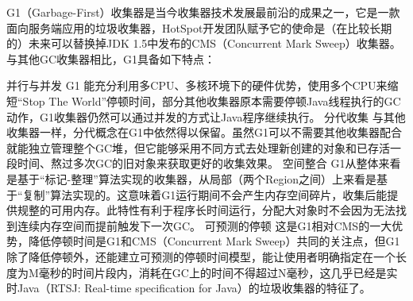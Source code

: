 \documentclass[../../../interview-questions.tex]{subfiles}
\begin{document}
G1（Garbage-First）收集器是当今收集器技术发展最前沿的成果之一，它是一款面向服务端应用的垃圾收集器，HotSpot开发团队赋予它的使命是（在比较长期的）未来可以替换掉JDK 1.5中发布的CMS（Concurrent Mark Sweep）收集器。与其他GC收集器相比，G1具备如下特点：

并行与并发 G1 能充分利用多CPU、多核环境下的硬件优势，使用多个CPU来缩短“Stop The World”停顿时间，部分其他收集器原本需要停顿Java线程执行的GC动作，G1收集器仍然可以通过并发的方式让Java程序继续执行。
分代收集 与其他收集器一样，分代概念在G1中依然得以保留。虽然G1可以不需要其他收集器配合就能独立管理整个GC堆，但它能够采用不同方式去处理新创建的对象和已存活一段时间、熬过多次GC的旧对象来获取更好的收集效果。
空间整合 G1从整体来看是基于“标记-整理”算法实现的收集器，从局部（两个Region之间）上来看是基于“复制”算法实现的。这意味着G1运行期间不会产生内存空间碎片，收集后能提供规整的可用内存。此特性有利于程序长时间运行，分配大对象时不会因为无法找到连续内存空间而提前触发下一次GC。
可预测的停顿 这是G1相对CMS的一大优势，降低停顿时间是G1和CMS（Concurrent Mark Sweep）共同的关注点，但G1除了降低停顿外，还能建立可预测的停顿时间模型，能让使用者明确指定在一个长度为M毫秒的时间片段内，消耗在GC上的时间不得超过N毫秒，这几乎已经是实时Java（RTSJ: Real-time specification for Java）的垃圾收集器的特征了。
\end{document}
